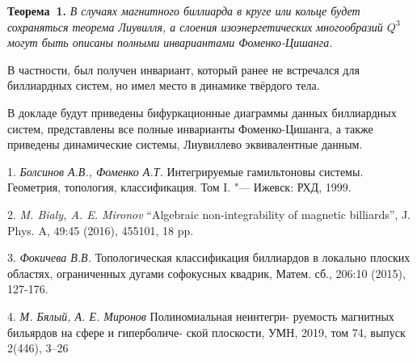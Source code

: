 	\textbf{Теорема~1.} {\it В случаях магнитного биллиарда в круге или кольце будет сохраняться теорема Лиувилля, а слоения изоэнергетических многообразий $Q^3$ могут быть описаны полными инвариантами Фоменко-Цишанга.}

	В частности, был получен инвариант, который ранее не встречался для биллиардных систем, но имел место в динамике твёрдого тела.

	В докладе будут приведены бифуркационные диаграммы данных биллиардных систем, представлены все полные инварианты Фоменко-Цишанга, а также приведены динамические системы, Лиувиллево эквивалентные данным.


\litlist

	1. {\it Болсинов А.В., Фоменко А.Т.} Интегрируемые гамильтоновы системы. Геометрия, топология, классификация. Том I.
	"--- Ижевск: РХД, 1999.


	2. {\it M. Bialy, A. E. Mironov} “Algebraic non-integrability of magnetic billiards”,
	J. Phys. A, 49:45 (2016), 455101, 18 pp.


	3. {\it Фокичева В.В.} Топологическая классификация биллиардов в локально плоских областях, ограниченных дугами софокусных квадрик, Матем. сб., 206:10 (2015), 127-176.

	4. {\it М. Бялый, А. Е. Миронов} Полиномиальная неинтегри-
	руемость магнитных бильярдов на сфере и гиперболиче-
	ской плоскости, УМН, 2019, том 74, выпуск 2(446), 3–26
